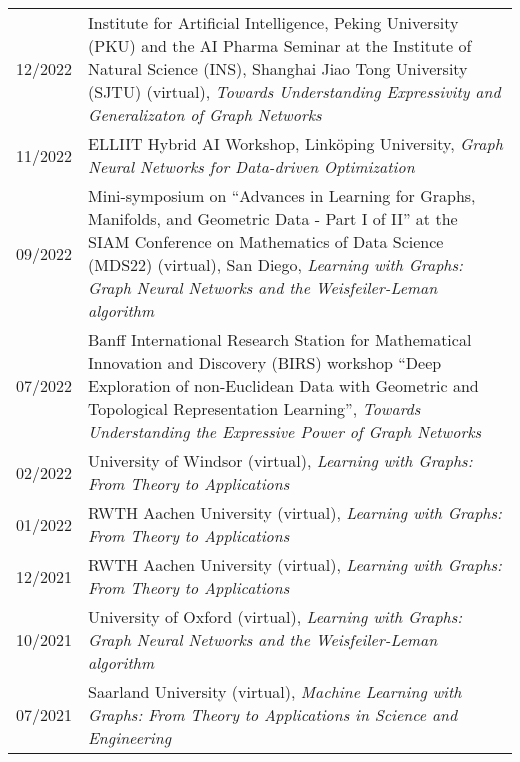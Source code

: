 \documentclass[11pt, a4paper, DIV=14, headings=small]{scrartcl}
\begin{document}
\begin{longtabu}{p{2.1cm}p{12.0cm}}
		12/2022 & Institute for Artificial Intelligence, Peking University (PKU) and the AI Pharma Seminar at the Institute of Natural Science (INS), Shanghai Jiao Tong University (SJTU) (virtual), \emph{Towards Understanding Expressivity and Generalizaton of Graph Networks}            \\
		11/2022 & ELLIIT Hybrid AI Workshop, Linköping University, \emph{Graph Neural Networks for Data-driven Optimization}                                                                                                                                                                    \\
		09/2022 & Mini-symposium on ``Advances in Learning for Graphs, Manifolds, and Geometric Data - Part I of II'' at the SIAM Conference on Mathematics of Data Science (MDS22) (virtual), San Diego, \emph{Learning with Graphs: Graph Neural Networks and the Weisfeiler-Leman algorithm} \\
		07/2022 & Banff International Research Station for Mathematical Innovation and Discovery (BIRS) workshop ``Deep Exploration of non-Euclidean Data with Geometric and Topological Representation Learning'',  \emph{Towards Understanding the Expressive Power of Graph Networks}        \\
		02/2022 & University of Windsor (virtual), \emph{Learning with Graphs: From Theory to Applications}                                                                                                                                                                                     \\
		01/2022 & RWTH Aachen University (virtual), \emph{Learning with Graphs: From Theory to Applications}                                                                                                                                                                                    \\
		12/2021 & RWTH Aachen University (virtual), \emph{Learning with Graphs: From Theory to Applications}                                                                                                                                                                                    \\
		10/2021 & University of Oxford (virtual), \emph{Learning with Graphs: Graph Neural Networks and the Weisfeiler-Leman algorithm}                                                                                                                                                         \\
		07/2021 & Saarland University (virtual), \emph{Machine Learning with Graphs: From Theory to Applications in Science and Engineering} \\

\end{longtabu}
\end{document}

